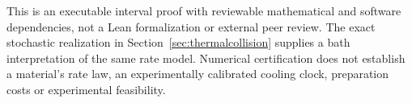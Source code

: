 \documentclass[11pt]{article}
\begin{document}
This is an executable interval proof with reviewable mathematical and
software dependencies, not a Lean formalization or external peer review.
The exact stochastic realization in Section~\ref{sec:thermalcollision}
supplies a bath interpretation of the same rate model. Numerical
certification does not establish a material's rate law, an experimentally
calibrated cooling clock, preparation costs or experimental feasibility.

\begin{figure}[htbp]
\centering
{}
\end{figure}
\end{document}
